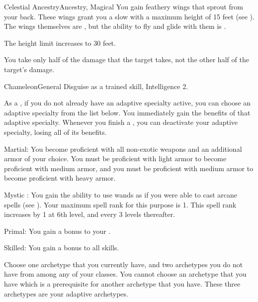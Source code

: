 \begin{magicalfeat}{Celestial Ancestry}{Ancestry, Magical}
     You gain feathery wings that sprout from your back.
    These wings grant you a slow  with a maximum height of 15 feet (see ).
    The wings themselves are , but the ability to fly and glide with them is \magical.

     The height limit increases to 30 feet.

     You take only half of the damage that the target takes, not the other half of the target's damage.
  \end{magicalfeat}

  \begin{feat}{Chameleon}{General}
    \featpre Disguise as a trained skill, Intelligence 2.

     As a , if you do not already have an adaptive specialty active, you can choose an adaptive specialty from the list below.
    You immediately gain the benefits of that adaptive specialty.
    Whenever you finish a , you can deactivate your adaptive specialty, losing all of its benefits.
    \begin{raggeditemize}
      \item Martial: You become proficient with all non-exotic weapons and an additional armor  of your choice.
        You must be proficient with light armor to become proficient with medium armor, and you must be proficient with medium armor to become proficient with heavy armor.
      \item Mystic \sparkle: You gain the ability to use wands as if you were able to cast arcane spells (see ).
        Your maximum spell rank for this purpose is 1.
        This spell rank increases by 1 at 6th level, and every 3 levels thereafter.
      \item Primal: You gain a  bonus to your .
      \item Skilled: You gain a  bonus to all skills.
    \end{raggeditemize}

     Choose one archetype that you currently have, and two archetypes you do not have from among any of your classes.
    You cannot choose an archetype that you have which is a prerequisite for another archetype that you have.
    These three archetypes are your adaptive archetypes.


\end{feat}
